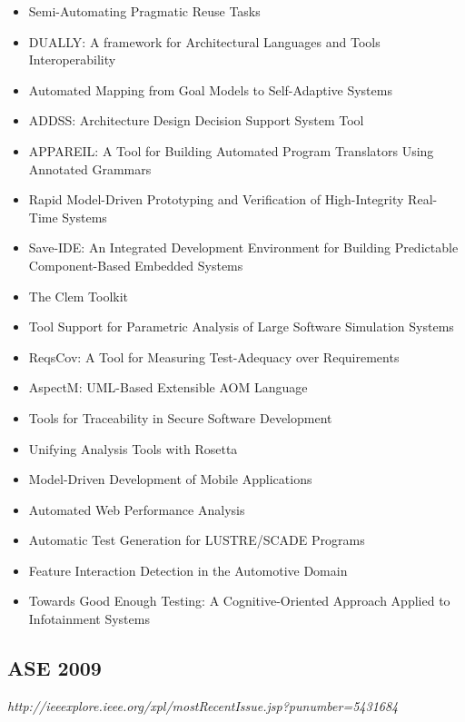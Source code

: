 {\begin{itemize}[itemsep=-1ex]
  \item Semi-Automating Pragmatic Reuse Tasks
  \item DUALLY: A framework for Architectural Languages and Tools Interoperability
  \item Automated Mapping from Goal Models to Self-Adaptive Systems
  \item ADDSS: Architecture Design Decision Support System Tool
  \item APPAREIL: A Tool for Building Automated Program Translators Using Annotated Grammars
  \item Rapid Model-Driven Prototyping and Verification of High-Integrity Real-Time Systems
  \item Save-IDE: An Integrated Development Environment for Building Predictable Component-Based Embedded Systems
  \item The Clem Toolkit
  \item Tool Support for Parametric Analysis of Large Software Simulation Systems
  \item ReqsCov: A Tool for Measuring Test-Adequacy over Requirements
  \item AspectM: UML-Based Extensible AOM Language
  \item Tools for Traceability in Secure Software Development
  \item Unifying Analysis Tools with Rosetta
  \item Model-Driven Development of Mobile Applications
  \item Automated Web Performance Analysis
  \item Automatic Test Generation for LUSTRE/SCADE Programs
  \item Feature Interaction Detection in the Automotive Domain
  \item Towards Good Enough Testing: A Cognitive-Oriented Approach Applied to Infotainment Systems
\end{itemize}
}

\subsection{ASE 2009}

{\small \em http://ieeexplore.ieee.org/xpl/mostRecentIssue.jsp?punumber=5431684}

